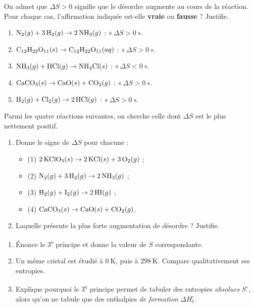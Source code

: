 \documentclass[11pt,a4paper]{article}
\begin{document}
\begin{exo}
On admet que $\Delta S>0$ signifie que le désordre augmente au cours de la réaction. Pour chaque cas, l'affirmation indiquée est-elle \textbf{vraie} ou \textbf{fausse} ? Justifie.
\begin{enumerate}[label=\alph*)]
  \item $\ce{N2}(g) + 3\,\ce{H2}(g) \rightarrow 2\,\ce{NH3}(g)$ : «\,$\Delta S>0$\,».
  \item $\ce{C12H22O11}(s) \rightarrow \ce{C12H22O11}(aq)$ : «\,$\Delta S>0$\,».
  \item $\ce{NH3}(g) + \ce{HCl}(g) \rightarrow \ce{NH4Cl}(s)$ : «\,$\Delta S<0$\,».
  \item $\ce{CaCO3}(s) \rightarrow \ce{CaO}(s) + \ce{CO2}(g)$ : «\,$\Delta S>0$\,».
  \item $\ce{H2}(g) + \ce{Cl2}(g) \rightarrow 2\,\ce{HCl}(g)$ : «\,$\Delta S>0$\,».
\end{enumerate}
\end{exo}

\begin{exo}
Parmi les quatre réactions suivantes, on cherche celle dont $\Delta S$ est le plus nettement positif.
\begin{enumerate}[label=\alph*)]
  \item Donne le signe de $\Delta S$ pour chacune :
  \begin{itemize}[leftmargin=1.4em,topsep=1pt,itemsep=1pt]
    \item (1) $2\,\ce{KClO3}(s) \rightarrow 2\,\ce{KCl}(s) + 3\,\ce{O2}(g)$ ;
    \item (2) $\ce{N2}(g) + 3\,\ce{H2}(g) \rightarrow 2\,\ce{NH3}(g)$ ;
    \item (3) $\ce{H2}(g) + \ce{I2}(g) \rightarrow 2\,\ce{HI}(g)$ ;
    \item (4) $\ce{CaCO3}(s) \rightarrow \ce{CaO}(s) + \ce{CO2}(g)$.
  \end{itemize}
  \item Laquelle présente la plus forte augmentation de désordre ? Justifie.
\end{enumerate}
\end{exo}

\begin{exo}
\begin{enumerate}[label=\alph*)]
  \item Énonce le 3\textsuperscript{e} principe et donne la valeur de $S$ correspondante.
  \item Un même cristal est étudié à $\qty{0}{\kelvin}$, puis à $\qty{298}{\kelvin}$. Compare qualitativement ses entropies.
  \item Explique pourquoi le 3\textsuperscript{e} principe permet de tabuler des entropies \emph{absolues} $S^\circ$, alors qu'on ne tabule que des enthalpies \emph{de formation} $\Delta H^\circ_{\text{f}}$.
\end{enumerate}
\end{exo}
\end{document}
